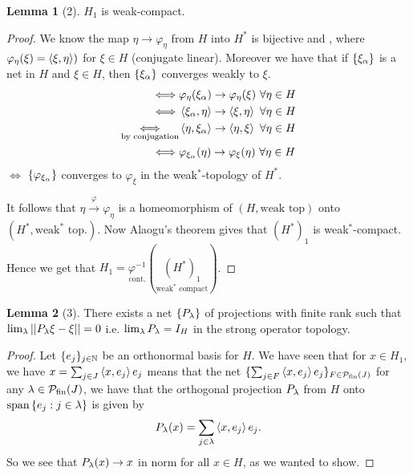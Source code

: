 \documentclass[10pt,english,a4paper]{article}
\theoremstyle{definition}
\newtheorem*{lemma}{Lemma}
\let\emph\relax %
\def\Psfin{\mathcal{P}_{\textnormal{fin}}}
\def\vphi{\varphi}
\begin{document}
\begin{lemma}[2]
    $H_1$ is weak-compact. 
\end{lemma}

\begin{proof}
    We know the map $\eta  \to \vphi_{\eta}$ from $H $ into $H^*$ is bijective 
and \emph{isometric}, where $\varphi_{\eta}(\xi) = \left\langle \xi,\eta \right\rangle)$ for $\xi \in H$
(conjugate linear). Moreover we have that if $\{\xi_{\alpha}\}$ is a net in $H$
and $\xi \in H$, then $\{\xi_{\alpha}\}$ converges weakly to $\xi$.
 \begin{align*}
     \iff& \varphi_{\eta}(\xi_{\al}) \to \varphi_{\eta}(\xi) ~\forall \eta \in H \\
     \iff& \ind{\xi_{\al},\eta} \to \ind{\xi,\eta} ~\forall \eta \in H \\
     \underset{\text{by conjugation}}{\iff}& \ind{\eta, \xi_{\al}} \to \ind{\eta, \xi} ~\forall \eta \in H \\
\iff&\vphi_{\xi_{\al}}(\eta) \to \varphi_{\xi}(\eta) ~\forall\eta\in H
 \end{align*}
$\iff$ $\{\vphi_{\xi_{\al}}\}$ converges to $\vphi_{\xi}$ in the weak$^*$-topology
of $H^*$.

It follows that $\eta \overset{\varphi}{\to} \varphi_{\eta}$ is a
homeomorphism of $(H,\text{weak top})$ onto $(H^*, \text{weak}^*\text{ top.})$.
Now Alaogu's theorem gives that $(H^*)_1$ is weak$^*$-compact. 
Hence we get that $H_1 = \underset{\text{cont.}}{\varphi^{-1}}(\underset{\text{weak}^*\text{ compact}}{(H^*)_1})$.
\end{proof}

\begin{lemma}[3]
    There exists a net $\{P_{\lambda}\}$ of projections with finite rank such that 
    $\lim_{\lambda} ||P_{\lambda} \xi - \xi|| = 0$ i.e. $\lim_{\lambda} P_{\lambda} = I_{H}$ 
    in the strong operator topology. 
\end{lemma}
\begin{proof}
   Let $\{e_j\}_{j\in \mathbb{N}}$ be an orthonormal basis for $H$. We have seen that for $x \in H_1$, 
we have $x = \sum_{j \in J} \left\langle x,e_j \right\rangle e_j$ means that the net $\{ \sum_{j\in F} \ind{x,e_j}e_j \}_{F\in\Psfin(J)}$ for any $\la \in \Psfin(J)$, we have that the orthogonal projection
$P_{\lambda}$ from $H$ onto  $\text{span} \left\{e_j:j\in \lambda\right\}$ is given by 
\[ P_{\lambda}(x) = \sum_{j\in\lambda} \left\langle x,e_j \right\rangle e_j. \]
So we see that $P_{\lambda}(x) \to x$ in norm for all $x \in H$, as we wanted to show.
\end{proof}
\end{document}
